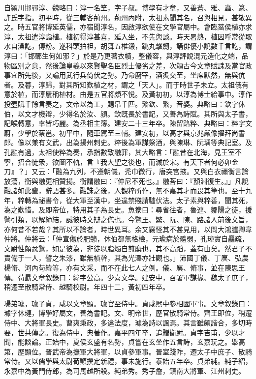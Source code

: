\begin{pinyinscope}
自潁川邯鄲淳、魏略曰：淳一名笁，字子叔。博學有才章，又善蒼、雅、蟲、篆、許氏字指。初平時，從三輔客荊州。荊州內附，太祖素聞其名，召與相見，甚敬異之。時五官將博延英儒，亦宿聞淳名，因啟淳欲使在文學官屬中。會臨菑侯植亦求淳，太祖遣淳詣植。植初得淳甚喜，延入坐，不先與談。時天暑熱，植因呼常從取水自澡訖，傅粉。遂科頭拍袒，胡舞五椎鍛，跳丸擊劒，誦俳優小說數千言訖，謂淳曰：「邯鄲生何如邪？」於是乃更著衣幘，整儀容，與淳評說混元造化之端，品物區別之意，然後論皇羲以來賢聖名臣烈士優劣之差，次頌古今文章賦誄及當官政事宜所先後，又論用武行兵倚伏之勢。乃命廚宰，酒炙交至，坐席默然，無與伉者。及暮，淳歸，對其所知歎植之材，謂之「天人」。而于時世子未立。太祖俄有意於植，而淳屢稱植材。由是五官將頗不恱。及黃初初，以淳為博士給事中。淳作投壺賦千餘言奏之，文帝以為工，賜帛千匹。繁欽、繁，音婆。典略曰：欽字休伯，以文才機辯，少得名於汝、潁。欽旣長於書記，又善為詩賦。其所與太子書，記喉轉意，率皆巧麗。為丞相主簿。建安二十三年卒。陳留路粹、典略曰：粹字文蔚，少學於蔡邕。初平中，隨車駕至三輔。建安初，以高才與京兆嚴像擢拜尚書郎。像以兼有文武，出為揚州刺史。粹後為軍謀祭酒，與陳琳、阮瑀等典記室。及孔融有過，太祖使粹為奏，承指數致融罪，其大略言：「融昔在北海，見王室不寧，招合徒衆，欲圖不軌，言『我大聖之後也，而滅於宋。有天下者何必卯金刀』？」又云：「融為九列，不遵朝儀，禿巾微行，唐突宮掖。又與白衣禰衡言論放蕩，衡與融更相贊揚。衡謂融曰：『仲尼不死也。』融荅曰：『顏淵復生。』」凡說融諸如此輩，辭語甚多。融誅之後，人覩粹所作，無不嘉其才而畏其筆也。至十九年，粹轉為祕書令，從大軍至漢中，坐違禁賤請驢伏法。太子素與粹善，聞其死，為之歎惜。及即帝位，特用其子為長史。魚豢曰：尋省往者，魯連、鄒陽之徒，援譬引類，以解締結，誠彼時文辯之儁也。今覽王、繁、阮、陳、路諸人前後文旨，亦何昔不若哉？其所以不論者，時世異耳。余又竊怪其不甚見用，以問大鴻臚卿韋仲將。仲將云：「仲宣傷於肥戇，休伯都無格檢，元瑜病於體弱，孔璋實自麤疏，文尉性頗忿鷙，如是彼為，非徒以脂燭自煎糜也，其不高蹈，蓋有由矣。然君子不責備于一人，譬之朱漆，雖無楨幹，其為光澤亦壯觀也。」沛國丁儀、丁廙、弘農楊脩、河內苟緯等，亦有文采，而不在此七人之例。儀、廙、脩事，並在陳思王傳。荀勗文章叙錄曰：緯字公高。少喜文學。建安中，召署軍謀掾、魏太子庶子，稍遷至散騎常侍、越騎校尉。年四十二，黃初四年卒。

瑒弟璩，璩子貞，咸以文章顯。璩官至侍中。貞咸熈中參相國軍事。文章叙錄曰：璩字休璉，博學好屬文，善為書記。文、明帝世，歷官散騎常侍。齊王即位，稍遷侍中、大將軍長史。曹爽秉政，多違法度，璩為詩以諷焉。其言雖頗諧合，多切時要，世共傳之。復為侍中，典著作。嘉平四年卒，追贈衞尉。貞字吉甫，少以才聞，能談論。正始中，夏侯玄盛有名勢，貞嘗在玄坐作五言詩，玄嘉玩之。舉高第，歷顯位。晉武帝為撫軍大將軍，以貞參軍事。晉室踐阼，遷太子中庶子、散騎常侍。又以儒學與太尉荀顗撰定新禮，事未施行。泰始五年卒。貞弟純。純子紹，永嘉中為黃門侍郎，為司馬越所殺。純弟秀。秀子詹，鎮南大將軍、江州刺史。


\end{pinyinscope}
